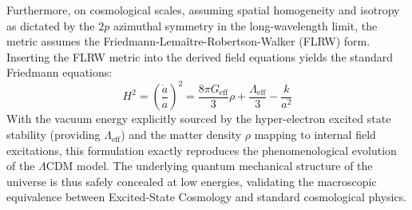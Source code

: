 Furthermore, on cosmological scales, assuming spatial homogeneity and isotropy as dictated by the $2p$ azimuthal symmetry in the long-wavelength limit, the metric assumes the Friedmann-Lema\^itre-Robertson-Walker (FLRW) form. Inserting the FLRW metric into the derived field equations yields the standard Friedmann equations:
\begin{equation}
H^2 = \left(\frac{\dot{a}}{a}\right)^2 = \frac{8\pi G_{\text{eff}}}{3} \rho + \frac{\Lambda_{\text{eff}}}{3} - \frac{k}{a^2}
\end{equation}
With the vacuum energy explicitly sourced by the hyper-electron excited state stability (providing $\Lambda_{\text{eff}}$) and the matter density $\rho$ mapping to internal field excitations, this formulation exactly reproduces the phenomenological evolution of the $\Lambda$CDM model. The underlying quantum mechanical structure of the universe is thus safely concealed at low energies, validating the macroscopic equivalence between Excited-State Cosmology and standard cosmological physics.
